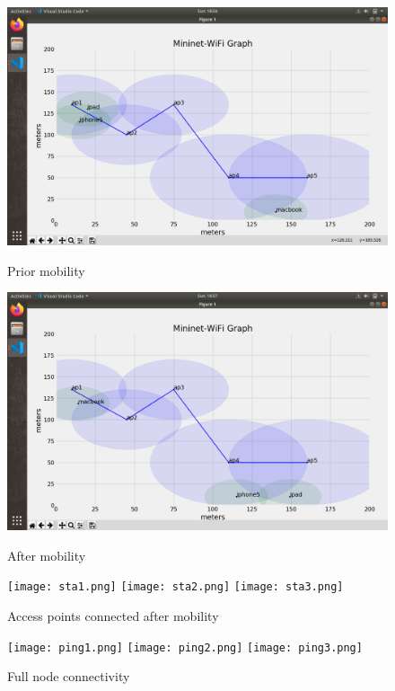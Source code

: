 \documentclass{article}
\begin{document}
    	\begin{figure}[h]
        			\includegraphics[width=0.9\linewidth]{beforeMobility.png}
        			\caption{Prior mobility}
       			\label{fig:t1-3}
        		\endminipage
		\centering
        			\includegraphics[width=0.9\linewidth]{afterMobility.png}
        			\caption{After mobility}
        			\label{fig:t1-4}
        		\endminipage\vspace{10pt}
        			\texttt{[image: sta1.png]}
        			\texttt{[image: sta2.png]}
        			\texttt{[image: sta3.png]}
        			\caption{Access points connected after mobility}
        			\label{fig:t1-5}
        		\endminipage\vspace{10pt}
        			\texttt{[image: ping1.png]}
        			\texttt{[image: ping2.png]}
       			\texttt{[image: ping3.png]}
        			\caption{Full node connectivity}
        			\label{fig:t1-6}
        		\endminipage
    	\end{figure}
\end{document}
